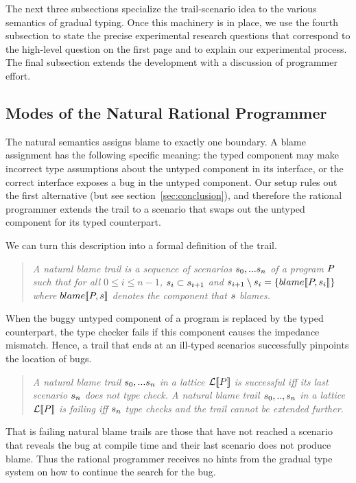
The next three subsections specialize the trail-scenario idea to the
various semantics of gradual typing. Once this machinery is in place,
we use the fourth subsection to state the precise experimental
research questions that correspond to the high-level question on the
first page and to explain our experimental process. The final
subsection extends the development with a discussion of programmer effort. 


\subsection{Modes of the Natural Rational Programmer} \label{sub:natural}

The natural semantics assigns blame to exactly one boundary.  A blame assignment
has the following specific meaning: the typed component may make incorrect type
assumptions about the untyped component in its interface, or the correct
interface exposes a bug in the untyped component. Our setup rules out the first
alternative (but see section~\ref{sec:conclusion}), and therefore the rational
programmer extends the trail to a scenario that swaps out the untyped component
for its typed counterpart.

We can turn this description into a formal definition of the trail. 
\begin{quote}
\it A \emph{natural blame trail} is a sequence of scenarios $s_0,...s_n$ of
a program $P$ such that for all $0 \leq i \leq n - 1$, $s_i \subset
s_{i+1}$ and $s_{i+1} \setminus s_i =\{blame\llbracket P, s_i\rrbracket\}$ where
$blame\llbracket P, s\rrbracket$ denotes the component that $s$ blames.
\end{quote}

When the buggy untyped component of a program is replaced by the typed counterpart,
the type checker fails if this component causes the impedance mismatch. Hence, a
trail that ends at an ill-typed scenarios successfully pinpoints the location of
bugs. 
\begin{quote}
\it A natural blame trail $s_0,...s_n$ in a lattice $\mathcal{L}\llbracket P\rrbracket$ is
\emph{successful} iff its last scenario $s_n$ does not type check.  A natural
blame trail $s_0,..,s_n$ in a lattice $\mathcal{L}\llbracket P\rrbracket$ is \emph{failing}
iff $s_n$ type checks and the trail cannot be extended further.
\end{quote}
That is failing natural blame trails are those that have not reached a scenario that
reveals the bug at compile time and their last scenario does not produce blame. Thus
the rational programmer receives no hints from the gradual type system on how to
continue the search for the bug.

